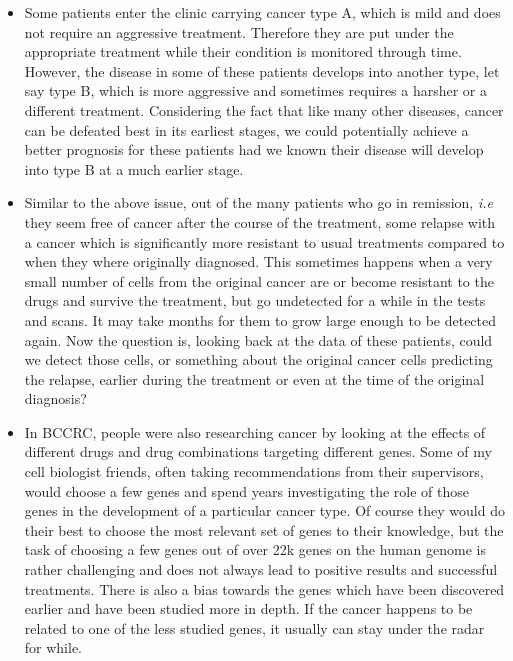 \begin{itemize}
  \item Some patients enter the clinic carrying cancer type A, which is mild
    and does not require an aggressive treatment. Therefore they are put under
    the appropriate treatment while their condition is monitored through time.
    However, the disease in some of these patients develops into another type,
    let say type B, which is more aggressive and sometimes requires a harsher
    or a different treatment. Considering the fact that like many other
    diseases, cancer can be defeated best in its earliest stages, we could
    potentially achieve a better prognosis for these patients had we known
    their disease will develop into type B at a much earlier stage.

    \item Similar to the above issue, out of the many patients who go in
      remission, \emph{i.e} they seem free of cancer after the course of the
      treatment, some relapse with a cancer which is significantly more
      resistant to usual treatments compared to when they where originally
      diagnosed. This sometimes happens when a very small number of cells from
      the original cancer are or become resistant to the drugs and survive the
      treatment, but go undetected for a while in the tests and scans. It may
      take months for them to grow large enough to be detected again. Now the
      question is, looking back at the data of these patients, could we detect
      those cells, or something about the original cancer cells predicting the
      relapse, earlier during the treatment or even at the time of the original
      diagnosis?

    \item In BCCRC, people were also researching cancer by looking at the
      effects of different drugs and drug combinations targeting different
      genes. Some of my cell biologist friends, often taking recommendations
      from their supervisors, would choose a few genes and spend years
      investigating the role of those genes in the development of a particular
      cancer type. Of course they would do their best to choose the most
      relevant set of genes to their knowledge, but the task of choosing a few
      genes out of over 22k genes on the human genome is rather challenging and
      does not always lead to positive results and successful treatments. There
      is also a bias towards the genes which have been discovered earlier and
      have been studied more in depth. If the cancer happens to be related to
      one of the less studied genes, it usually can stay under the radar for
      while.
\end{itemize}

